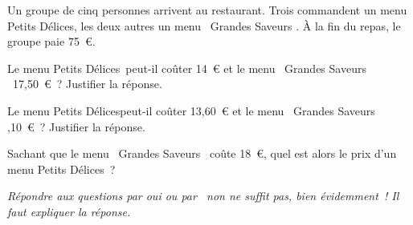 Un groupe de cinq personnes arrivent au restaurant.
Trois commandent un menu \og Petits Délices\fg, les deux autres un menu \og Grandes Saveurs \fg. \`A la fin du repas, le groupe paie 75~\textgreek{\euro}.
\begin{myenumerate}
\item Le menu \og Petits Délices\fg\ peut-il coûter 14~\textgreek{\euro} et le menu \og Grandes Saveurs \fg\ 17,50~\textgreek{\euro} ? Justifier la réponse.
\item Le menu \og Petits Délices\fg peut-il coûter 13,60~\textgreek{\euro} et le menu \og Grandes Saveurs ,10~\textgreek{\euro} ? Justifier la réponse.
\item Sachant que le menu \og Grandes Saveurs \fg\ coûte 18~\textgreek{\euro}, quel est alors le prix d'un menu \og Petits Délices\fg ?
\end{myenumerate}
{\em Répondre aux questions par {\em oui} ou par {\em non} ne suffit pas, bien évidemment ! Il faut expliquer la réponse.}